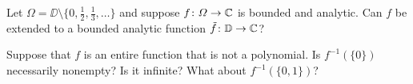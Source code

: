 \documentclass {../math135}
\begin{document}
\begin {exercise}
	Let \(\Omega = \DD \setminus \{0, \frac 1 2, \frac 1 3, \ldots\}\)
  and suppose \(f \colon \Omega \to \mathbb C\) is bounded and analytic.
  Can \(f\) be extended to a bounded analytic function
  \(\tilde f \colon \mathbb D \to \mathbb C\)?

  \begin {solution}

  \end {solution}

\end {exercise}

\begin {exercise}
	Suppose that \(f\) is an entire function that is not a polynomial.
  Is \(f^{-1}(\{0\})\) necessarily nonempty?  Is it infinite?  What
  about \(f^{-1}(\{0, 1\})\)?

  \begin {solution}

  \end {solution}

\end {exercise}
\end{document}

